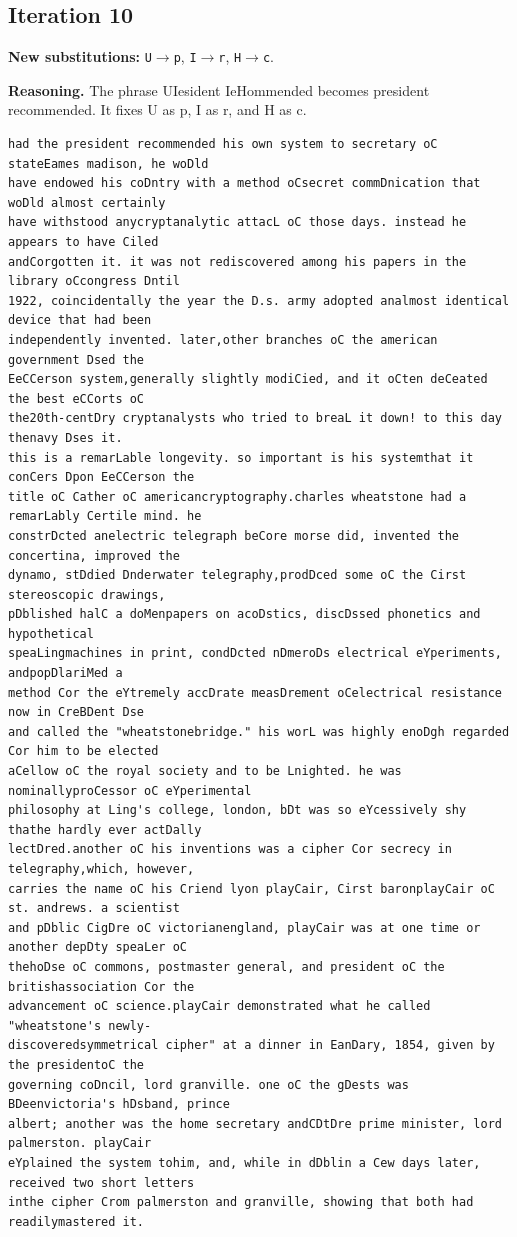 \documentclass[12pt,a4paper]{article}
\begin{document}
\subsection{Iteration 10}

\noindent\textbf{New substitutions:} \texttt{U}$\rightarrow$\texttt{p}, \texttt{I}$\rightarrow$\texttt{r}, \texttt{H}$\rightarrow$\texttt{c}.\par
\smallskip
\noindent\textbf{Reasoning.} The phrase UIesident IeHommended becomes president recommended. It fixes U as p, I as r, and H as c.

\begin{lstlisting}[style=ciphertext,caption={Complete text after iteration 10}]
had the president recommended his own system to secretary oC stateEames madison, he woDld
have endowed his coDntry with a method oCsecret commDnication that woDld almost certainly
have withstood anycryptanalytic attacL oC those days. instead he appears to have Ciled
andCorgotten it. it was not rediscovered among his papers in the library oCcongress Dntil
1922, coincidentally the year the D.s. army adopted analmost identical device that had been
independently invented. later,other branches oC the american government Dsed the
EeCCerson system,generally slightly modiCied, and it oCten deCeated the best eCCorts oC
the20th-centDry cryptanalysts who tried to breaL it down! to this day thenavy Dses it.
this is a remarLable longevity. so important is his systemthat it conCers Dpon EeCCerson the
title oC Cather oC americancryptography.charles wheatstone had a remarLably Certile mind. he
constrDcted anelectric telegraph beCore morse did, invented the concertina, improved the
dynamo, stDdied Dnderwater telegraphy,prodDced some oC the Cirst stereoscopic drawings,
pDblished halC a doMenpapers on acoDstics, discDssed phonetics and hypothetical
speaLingmachines in print, condDcted nDmeroDs electrical eYperiments, andpopDlariMed a
method Cor the eYtremely accDrate measDrement oCelectrical resistance now in CreBDent Dse
and called the "wheatstonebridge." his worL was highly enoDgh regarded Cor him to be elected
aCellow oC the royal society and to be Lnighted. he was nominallyproCessor oC eYperimental
philosophy at Ling's college, london, bDt was so eYcessively shy thathe hardly ever actDally
lectDred.another oC his inventions was a cipher Cor secrecy in telegraphy,which, however,
carries the name oC his Criend lyon playCair, Cirst baronplayCair oC st. andrews. a scientist
and pDblic CigDre oC victorianengland, playCair was at one time or another depDty speaLer oC
thehoDse oC commons, postmaster general, and president oC the britishassociation Cor the
advancement oC science.playCair demonstrated what he called "wheatstone's newly-
discoveredsymmetrical cipher" at a dinner in EanDary, 1854, given by the presidentoC the
governing coDncil, lord granville. one oC the gDests was BDeenvictoria's hDsband, prince
albert; another was the home secretary andCDtDre prime minister, lord palmerston. playCair
eYplained the system tohim, and, while in dDblin a Cew days later, received two short letters
inthe cipher Crom palmerston and granville, showing that both had readilymastered it.
\end{lstlisting}
\end{document}
